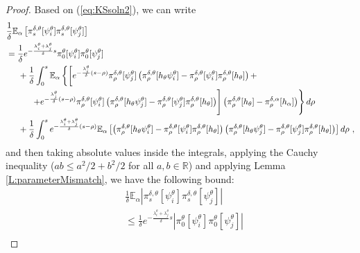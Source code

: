 \documentclass{article}
\begin{document}
\begin{proof}
Based on (\ref{eq:KSsoln2}), we can write
\begin{align}
&\frac{1}{\delta}\mathbb{E}_{\alpha}\left[\pi_s^{\delta,\theta}[\psi_{i}^{\theta}]\pi_s^{\delta,\theta}[\psi_{j}^{\theta}]\right]\nonumber\\
&=\frac{1}{\delta}e^{-\frac{\lambda_i^{\theta}+\lambda_j^{\theta}}{\delta}s}\pi^{\theta}_{0}[\psi_{i}^{\theta}]\pi^{\theta}_{0}[\psi_{j}^{\theta}]\nonumber\\
&\hspace{0.5cm}+\frac{1}{\delta}\int_{0}^{s}
\mathbb{E}_{\alpha}\left\{\left[e^{-\frac{\lambda_i^{\theta}}{\delta}(s-\rho)}\pi^{\delta,\theta}_{\rho}[\psi_{j}^{\theta}]\left(\pi^{\delta,\theta}_{\rho}[h_{\theta}\psi_{i}^{\theta}]-\pi^{\delta,\theta}_{\rho}[\psi_{i}^{\theta}]\pi^{\delta,\theta}_{\rho}[h_{\theta}]   \right)+\right.\right.\nonumber\\
&\hspace{1cm}\left.\left.+e^{-\frac{\lambda_j^{\theta}}{\delta}(s-\rho)}\pi^{\delta,\theta}_{\rho}[\psi_{i}^{\theta}]\left(\pi^{\delta,\theta}_{\rho}[h_{\theta}\psi_{j}^{\theta}]-\pi^{\delta,\theta}_{\rho}[\psi_{j}^{\theta}]\pi^{\delta,\theta}_{\rho}[h_{\theta}]   \right)\right]\left(\pi^{\delta,\theta}_{\rho}[h_{\theta}]-\pi^{\delta,\alpha}_{\rho}[h_{\alpha}]\right)\right\}d\rho\nonumber\\
&\hspace{0.5cm}+\frac{1}{\delta}\int_{0}^{s}e^{-\frac{\lambda_i^{\theta}+\lambda_j^{\theta}}{\delta}(s-\rho)}
\mathbb{E}_{\alpha}\left[\left(\pi^{\delta,\theta}_{\rho}[h_{\theta}\psi_{i}^{\theta}]-\pi^{\delta,\theta}_{\rho}[\psi_{i}^{\theta}]\pi^{\delta,\theta}_{\rho}[h_{\theta}]   \right)\left(\pi^{\delta,\theta}_{\rho}[h_{\theta}\psi_{j}^{\theta}]-\pi^{\delta,\theta}_{\rho}[\psi_{j}^{\theta}]\pi^{\delta,\theta}_{\rho}[h_{\theta}]   \right)\right]d\rho \ ,
\label{Eq:UsedForBoundPsi}
\end{align}
and then taking absolute values inside the integrals, applying the Cauchy inequality ($ab\leq a^{2}/2+b^{2}/2$ for all $a,b\in\mathbb R$) and applying Lemma \ref{L:parameterMismatch}, we have the following bound:
\begin{align}
&\frac{1}{\delta}\mathbb{E}_{\alpha}\left|\pi_s^{\delta,\theta}[\psi_{i}^{\theta}]\pi_s^{\delta,\theta}[\psi_{j}^{\theta}]\right|\nonumber\\
&\leq \frac{1}{\delta}e^{-\frac{\lambda_i^{\theta}+\lambda_j^{\theta}}{\delta}s}\left|\pi^{\theta}_{0}[\psi_{i}^{\theta}]\pi^{\theta}_{0}[\psi_{j}^{\theta}]\right|\nonumber\\

\end{align}
\end{proof}
\end{document}
